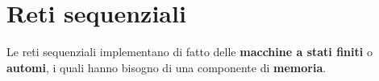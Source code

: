 \section{Reti sequenziali}
Le reti sequenziali implementano di fatto delle \textbf{macchine a stati finiti} o \textbf{automi},
i quali hanno bisogno di una componente di \textbf{memoria}.
